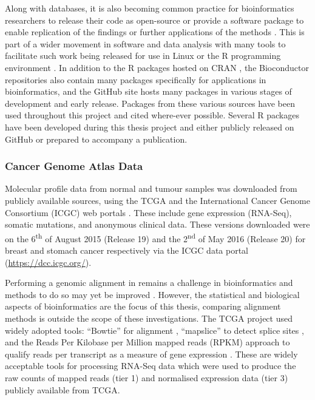 Along with databases, it is also becoming common practice for bioinformatics researchers to release their code as open-source or provide a software package to enable replication of the findings or further applications of the methods \citep{Stajich2006}. This is part of a wider movement in software and data analysis with many tools to facilitate such work being released for use in Linux or the R programming environment \citep{R_core}. In addition to the R packages hosted on CRAN \citep{CRAN}, the Bioconductor repositories \citep{Gentleman2004} also contain many packages specifically for applications in bioinformatics, and the GitHub site hosts many packages in various stages of development and early release. Packages from these various sources have been used throughout this project and cited where-ever possible. Several R packages have been developed during this thesis project and either publicly released on GitHub or prepared to accompany a publication.

\subsubsection{Cancer Genome Atlas Data}
Molecular profile data from normal and tumour samples was downloaded from publicly available sources, using the TCGA \citep{TCGA2012} and the International Cancer Genome Consortium (ICGC) web portals \citep{ICGC2011}. These include gene expression (RNA-Seq), somatic mutations, and anonymous clinical data. These versions downloaded were on the 6\textsuperscript{th} of August  2015 (Release 19) and the 2\textsuperscript{nd} of May 2016 (Release 20) for breast and stomach cancer respectively via the ICGC data portal (\url{https://dcc.icgc.org/}).

Performing a genomic alignment in remains a challenge in bioinformatics and methods to do so may yet be improved \citep{Chen2010}. However, the statistical and biological aspects of bioinformatics are the focus of this thesis, comparing alignment methods is outside the scope of these investigations. The TCGA project \citep{TCGA2012} used widely adopted tools: ``Bowtie''  for alignment \citep{bowtie}, ``mapslice'' to detect splice sites \citep{mapsplice}, and the Reads Per Kilobase per Million mapped reads (RPKM) approach to qualify reads per transcript as a measure of gene expression \citep{Mortazavi2008}. These are widely acceptable tools for processing RNA-Seq data which were used to produce the raw counts of mapped reads (tier 1) and normalised expression data (tier 3) publicly available from TCGA.

